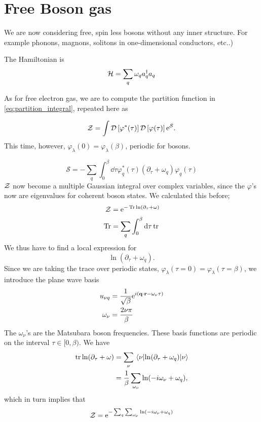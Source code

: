 \section{Free Boson gas}


We are now considering free, spin less bosons without any inner structure. For example phonons, magnons, solitons in one-dimensional conductors, etc..)

The Hamiltonian is 
\begin{equation}
\mathcal{H} = \sum_q \omega_qa_q^\dagger a_q
\end{equation}

As for free electron gas, we are to compute the partition function in \eqref{eq:partition_integral}, repeated here as 

\begin{equation}
\mathcal{Z} = \int \mathcal{D}\left[\varphi^*(\tau)\right]\mathcal{D}\left[\varphi(\tau)\right]\mathrm{e}^{\mathcal{S}}.
\end{equation}
This time, however, $\varphi_\lambda(0) = \varphi_\lambda(\beta)$, periodic for bosons.

\begin{equation}
\mathcal{S} = -\sum_{q}\int_0^\beta\dd{\tau}\varphi_{q}^*(\tau)\left(\partial_{\tau} + \omega_q\right)\varphi_{q}(\tau)
\end{equation}
\(\mathcal{Z}\) now become a multiple Gaussian integral over complex variables, since the $\varphi$'s now are eigenvalues for coherent boson states. We calculated this before;
\begin{align*}
\mathcal{Z} &= \mathrm{e}^{-\Tr\ln(\partial_\tau + \omega)} \\
\Tr &= \sum_q\int_0^\beta\dd{\tau}\tr
\end{align*}
We thus have to find a local expression for 
\begin{equation}
\ln(\partial_\tau + \omega_q).
\end{equation}
Since we are taking the trace over periodic states, \(\varphi_\lambda(\tau =0) = \varphi_\lambda(\tau =\beta)\), we introduce the plane wave basis
\begin{align*}
u_{\nu q} &= \frac{1}{\sqrt{\beta}}\mathrm{e}^{i(\vb q\cdot \vb{r} - \omega_\nu\tau)}\\
\omega_\nu &= \frac{2\nu\pi}{\beta}
\end{align*}
The \(\omega_\nu\)'s are the Matsubara boson frequencies. These basis functions are periodic on the interval \( \tau \in [0,\beta) \).
We have
\begin{align*}
\tr\ln(\partial_\tau + \omega) &= \sum_\nu \ev{\ln(\partial_\tau + \omega_q)}{\nu}\\
&=\frac{1}{\beta}\sum_{\omega_\nu}\ln(-i\omega_\nu + \omega_q),
\end{align*}
which in turn implies that
\begin{equation}
\label{eq:boson_partition}
\mathcal{Z} = \mathrm{e}^{-\sum_{q}\sum_{\omega_\nu}\ln(-i\omega_\nu+\omega_q)}
\end{equation}

